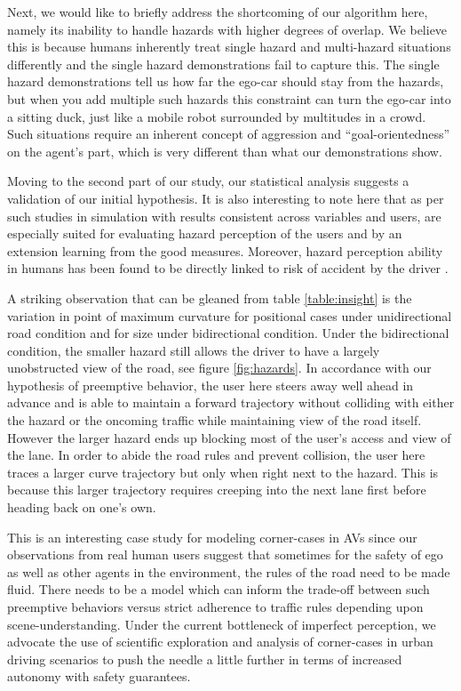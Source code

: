 \documentclass{article}
\begin{document}
Next, we would like to briefly address the shortcoming of our algorithm here, namely its 
inability to handle hazards with higher degrees of overlap. We believe this is because humans
inherently treat single hazard and multi-hazard situations differently and the single hazard
demonstrations fail to capture this. The single hazard demonstrations tell us how far the 
ego-car should stay from the hazards, but when you add multiple such hazards this constraint
can turn the ego-car into a sitting duck, just like a mobile robot surrounded by multitudes 
in a crowd. Such situations require an inherent concept of aggression and ``goal-orientedness'' 
on the agent's part, which is very different than what our demonstrations show.

Moving to the second part of our study, our statistical analysis suggests a validation of our 
initial hypothesis. It is also interesting to
note here that as per \citet{berndt1994using} such studies in simulation with results consistent across
variables and users, are especially suited for evaluating hazard perception of the users and by an
extension learning from the good measures.
Moreover, hazard perception ability in humans has been found to be directly linked to
risk of accident by the driver \cite{mckenna1999hazard}.

A striking observation that can be gleaned from table \ref{table:insight} is the variation in
point of maximum curvature for positional cases under unidirectional road condition
and for size under bidirectional condition.
Under the bidirectional condition, the smaller hazard still allows the driver to have a largely
unobstructed view of the road, see figure \ref{fig:hazards}.
In accordance with our hypothesis of preemptive behavior, the user here steers away well ahead
in advance and is able to maintain a forward trajectory without colliding with either the hazard
or the oncoming traffic while maintaining view of the road itself.
However the larger hazard ends up blocking most of the user's access and view of the lane.
In order to abide the road rules and prevent collision, the user here traces a larger curve 
trajectory but only when right next to the hazard.
This is because this larger trajectory requires creeping into the next lane first before heading
back on one's own.

This is an interesting case study for modeling corner-cases in AVs since our observations from
real human users suggest that sometimes for the safety of ego as well as other agents in
the environment, the rules of the road need to be made fluid.
There needs to be a model which can inform the trade-off between such preemptive behaviors
versus strict adherence to traffic rules depending upon scene-understanding.
Under the current bottleneck of imperfect perception, we advocate the use of scientific
exploration and analysis of corner-cases in urban driving scenarios to push the
needle a little further in terms of increased autonomy with safety guarantees.
\end{document}
